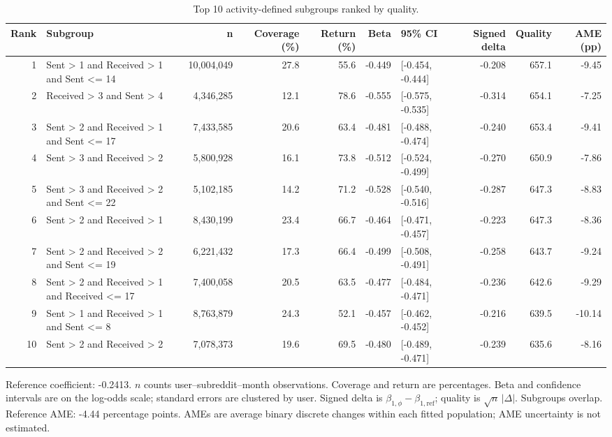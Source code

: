 \begin{table}[t]
\centering
\small
\setlength{\tabcolsep}{3pt}
\caption{Top 10 activity-defined subgroups ranked by quality.}
\label{tab:top-subgroups}
\begin{tabular}{rlrrrrlrrr}
\toprule
Rank & Subgroup & n & Coverage (\%) & Return (\%) & Beta & 95\% CI & Signed delta & Quality & AME (pp) \\
\midrule
1 & Sent > 1 and Received > 1 and Sent <= 14 & 10,004,049 & 27.8 & 55.6 & -0.449 & [-0.454, -0.444] & -0.208 & 657.1 & -9.45 \\
2 & Received > 3 and Sent > 4 & 4,346,285 & 12.1 & 78.6 & -0.555 & [-0.575, -0.535] & -0.314 & 654.1 & -7.25 \\
3 & Sent > 2 and Received > 1 and Sent <= 17 & 7,433,585 & 20.6 & 63.4 & -0.481 & [-0.488, -0.474] & -0.240 & 653.4 & -9.41 \\
4 & Sent > 3 and Received > 2 & 5,800,928 & 16.1 & 73.8 & -0.512 & [-0.524, -0.499] & -0.270 & 650.9 & -7.86 \\
5 & Sent > 3 and Received > 2 and Sent <= 22 & 5,102,185 & 14.2 & 71.2 & -0.528 & [-0.540, -0.516] & -0.287 & 647.3 & -8.83 \\
6 & Sent > 2 and Received > 1 & 8,430,199 & 23.4 & 66.7 & -0.464 & [-0.471, -0.457] & -0.223 & 647.3 & -8.36 \\
7 & Sent > 2 and Received > 2 and Sent <= 19 & 6,221,432 & 17.3 & 66.4 & -0.499 & [-0.508, -0.491] & -0.258 & 643.7 & -9.24 \\
8 & Sent > 2 and Received > 1 and Received <= 17 & 7,400,058 & 20.5 & 63.5 & -0.477 & [-0.484, -0.471] & -0.236 & 642.6 & -9.29 \\
9 & Sent > 1 and Received > 1 and Sent <= 8 & 8,763,879 & 24.3 & 52.1 & -0.457 & [-0.462, -0.452] & -0.216 & 639.5 & -10.14 \\
10 & Sent > 2 and Received > 2 & 7,078,373 & 19.6 & 69.5 & -0.480 & [-0.489, -0.471] & -0.239 & 635.6 & -8.16 \\
\bottomrule
\end{tabular}
\begin{minipage}{\textwidth}
\footnotesize
Reference coefficient: -0.2413. $n$ counts user--subreddit--month observations. Coverage and return are percentages. Beta and confidence intervals are on the log-odds scale; standard errors are clustered by user. Signed delta is $\beta_{1,\phi}-\beta_{1,\mathrm{ref}}$; quality is $\sqrt{n}\,|\Delta|$. Subgroups overlap. Reference AME: -4.44 percentage points. AMEs are average binary discrete changes within each fitted population; AME uncertainty is not estimated.
\end{minipage}
\end{table}
